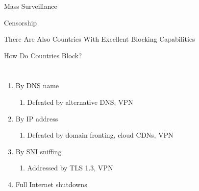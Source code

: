 \documentclass[nobackground,dvipsnames,table]{beamer}
\begin{document}
\begin{frame}{}%
    Mass Surveillance
\end{frame}

\begin{frame}{}
\end{frame}

\begin{frame}{}
\end{frame}

\begin{frame}{}
\end{frame}

\begin{frame}{}
\end{frame}

\begin{frame}{}%
    Censorship
\end{frame}

\begin{frame}{There Are Also Countries With Excellent Blocking Capabilities}
\end{frame}

\begin{frame}{How Do Countries Block?}
    \begin{columns}
            \begin{enumerate}
                \item By DNS name
                \begin{enumerate}
                    \item Defeated by alternative DNS, VPN
                \end{enumerate}
        
                \item By IP address
                \begin{enumerate}
                    \item Defeated by domain fronting, cloud CDNs, VPN
                \end{enumerate}
        
                \item By SNI sniffing
                \begin{enumerate}
                    \item Addressed by TLS 1.3, VPN
                \end{enumerate}
        
                \item Full Internet shutdowns
            \end{enumerate}
    \end{columns}
\end{frame}
\end{document}
